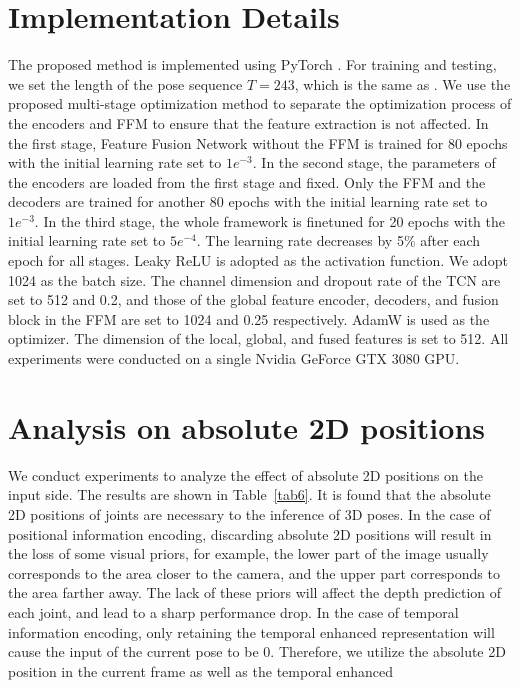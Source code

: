 \documentclass[sigconf]{acmart}
\begin{document}
\begin{multicols}{2}
\section{Implementation Details}\label{implement}
The proposed method is implemented using PyTorch . For training and testing, we set the length of the pose sequence $T=243$, which is the same as . We use the proposed multi-stage optimization method to separate the optimization process of the encoders and FFM to ensure that the feature extraction is not affected. In the first stage, Feature Fusion Network without the FFM is trained for 80 epochs with the initial learning rate set to $1e^{-3}$. In the second stage, the parameters of the encoders are loaded from the first stage and fixed. Only the FFM and the decoders are trained for another 80 epochs with the initial learning rate set to $1e^{-3}$. In the third stage, the whole framework is finetuned for 20 epochs with the initial learning rate set to $5e^{-4}$. The learning rate decreases by 5\% after each epoch for all stages. Leaky ReLU  is adopted as the activation function. We adopt 1024 as the batch size. The channel dimension and dropout rate of the TCN are set to 512 and 0.2, and those of the global feature encoder, decoders, and fusion block in the FFM are set to 1024 and 0.25 respectively. AdamW  is used as the optimizer. The dimension of the local, global, and fused features is set to 512. All experiments were conducted on a single Nvidia GeForce GTX 3080 GPU.

\section{Analysis on absolute 2D positions}
We conduct experiments to analyze the effect of absolute 2D positions on the input side. The results are shown in Table~\ref{tab6}. It is found that the absolute 2D positions of joints are necessary to the inference of 3D poses. In the case of positional information encoding, discarding absolute 2D positions will result in the loss of some visual priors, for example, the lower part of the image usually corresponds to the area closer to the camera, and the upper part corresponds to the area farther away. The lack of these priors will affect the depth prediction of each joint, and lead to a sharp performance drop. In the case of temporal information encoding, only retaining the temporal enhanced representation will cause the input of the current pose to be 0. Therefore, we utilize the absolute 2D position in the current frame as well as the temporal enhanced



\end{multicols}
\end{document}
